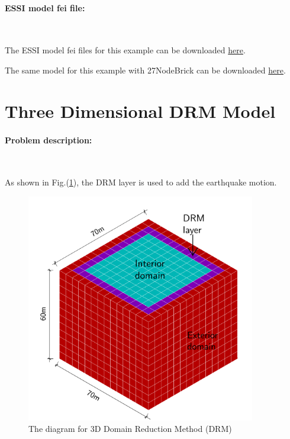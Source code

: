 \documentclass[fleqn,11pt]{article}
\begin{document}
\paragraph{ESSI model fei file: } ~



The ESSI model fei files for this example can be downloaded \href{https://github.com/yuan-energy/Real-ESSI-Examples/blob/master/model_fei_file/8NodeBrick_DRM_1D/8NodeBrick_DRM_1D.tgz?raw=true}{here}.

The same model for this example with 27NodeBrick can be downloaded \href{https://github.com/yuan-energy/Real-ESSI-Examples/blob/master/model_fei_file/27NodeBrick_DRM_1D/27NodeBrick_DRM_1D.tgz?raw=true}{here}.




\vskip 20pt
\section{Three Dimensional DRM Model}

\paragraph{Problem description:} ~

As shown in Fig.(\ref{fig The diagram for Domain Reduction Method DRM }), the DRM layer is used to add the earthquake motion. 


\begin{figure}[H]
  \centering
  \includegraphics[width=10cm]{../Figure-files/DRM_3D_descp_3.pdf}
  \caption{The diagram for 3D Domain Reduction Method (DRM) }
  \label{fig The diagram for Domain Reduction Method DRM }
\end{figure}
\end{document}
